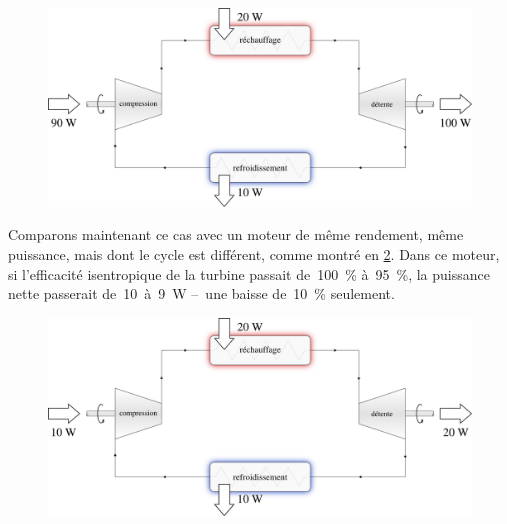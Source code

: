 		\begin{figure}%
			\begin{center}
				\includegraphics[width=\textwidth]{images/marge_travail_1.png}
			\end{center}
			\label{fig_rapport_puissances_1}
		\end{figure}

		Comparons maintenant ce cas avec un moteur de même rendement, même puissance, mais dont le cycle est différent, comme montré en \cref{fig_rapport_puissances_2}. Dans ce moteur, si l’efficacité isentropique de la turbine passait de~\SI{100}{\percent} à~\SI{95}{\percent}, la puissance nette passerait de~10~à~\SI{9}{\watt} --\ une baisse de~\SI{10}{\percent} seulement.

		\begin{figure}%
			\begin{center}
				\includegraphics[width=\textwidth]{images/marge_travail_2.png}
			\end{center}
			\label{fig_rapport_puissances_2}
		\end{figure}

